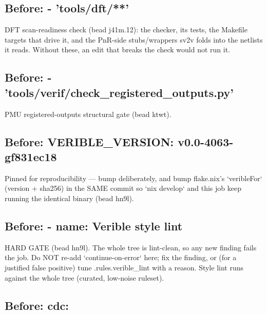 \begin{record}
\subsection*{Before: - 'tools/dft/**'}

\begin{textblock}
DFT scan-readiness check (bead j41m.12): the checker, its tests, the Makefile
targets that drive it, and the PnR-side stubs/wrappers sv2v folds into the
netlists it reads. Without these, an edit that breaks the check would not run it.
\end{textblock}

\subsection*{Before: - 'tools/verif/check\_registered\_outputs.py'}

\begin{textblock}
PMU registered-outputs structural gate (bead ktwt).
\end{textblock}

\subsection*{Before: VERIBLE\_VERSION: v0.0-4063-gf831ec18}

\begin{textblock}
Pinned for reproducibility — bump deliberately, and bump flake.nix's
`veribleFor` (version + sha256) in the SAME commit so `nix develop` and this
job keep running the identical binary (bead hn9l).
\end{textblock}

\subsection*{Before: - name: Verible style lint}

\begin{textblock}
HARD GATE (bead hn9l). The whole tree is lint-clean, so any new finding
fails the job. Do NOT re-add `continue-on-error` here; fix the finding, or
(for a justified false positive) tune .rules.verible_lint with a reason.
Style lint runs against the whole tree (curated, low-noise ruleset).
\end{textblock}

\subsection*{Before: cdc:}


\end{record}
